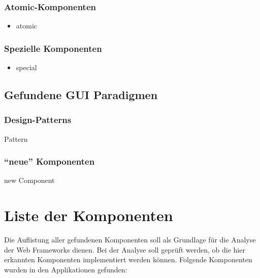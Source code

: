   \subsubsection{Atomic-Komponenten}
  
  \begin{itemize}
    \item atomic
  \end{itemize}
  
  \subsubsection{Spezielle Komponenten}
    
  \begin{itemize}
    \item special
  \end{itemize}
  
  \subsection{Gefundene GUI Paradigmen}
    
  \subsubsection{Design-Patterns}
  
  \begin{description}
    \item[Pattern]
  \end{description}
  
  \subsubsection{``neue'' Komponenten}
  
  \begin{description}
    \item[new Component]
  \end{description}
  
  \section{Liste der Komponenten}
  
  Die Auflistung aller gefundenen Komponenten soll als Grundlage für die Analyse
  der Web Frameworks dienen. Bei der Analyse soll geprüft werden, ob die hier
  erkannten Komponenten implementiert werden können. Folgende Komponenten
  wurden in den Applikationen gefunden:
  
